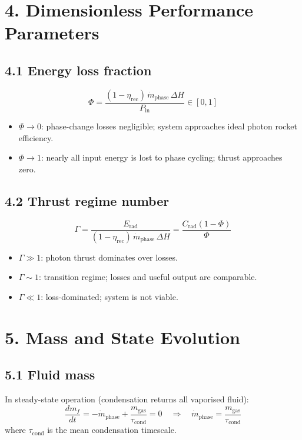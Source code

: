 \documentclass[12pt]{article}
\begin{document}
\section*{4. Dimensionless Performance Parameters}

\subsection*{4.1 Energy loss fraction}
\[
  \Phi = \frac{(1-\eta_{\mathrm{rec}})\,\dot{m}_{\mathrm{phase}}\,\Delta H}{P_{\mathrm{in}}}
  \in [0,1]
\]
\begin{itemize}
  \item $\Phi \to 0$: phase-change losses negligible; system approaches ideal
        photon rocket efficiency.
  \item $\Phi \to 1$: nearly all input energy is lost to phase cycling;
        thrust approaches zero.
\end{itemize}

\subsection*{4.2 Thrust regime number}
\[
  \Gamma = \frac{E_{\mathrm{rad}}}{(1-\eta_{\mathrm{rec}})\,\dot{m}_{\mathrm{phase}}\,\Delta H}
  = \frac{C_{\mathrm{rad}}(1-\Phi)}{\Phi}
\]
\begin{itemize}
  \item $\Gamma \gg 1$: photon thrust dominates over losses.
  \item $\Gamma \sim 1$: transition regime; losses and useful output are comparable.
  \item $\Gamma \ll 1$: loss-dominated; system is not viable.
\end{itemize}

\section*{5. Mass and State Evolution}

\subsection*{5.1 Fluid mass}
In steady-state operation (condensation returns all vaporised fluid):
\[
  \frac{dm_f}{dt} = -\dot{m}_{\mathrm{phase}} + \frac{m_{\mathrm{gas}}}{\tau_{\mathrm{cond}}} = 0
  \quad\Longrightarrow\quad
  \dot{m}_{\mathrm{phase}} = \frac{m_{\mathrm{gas}}}{\tau_{\mathrm{cond}}}
\]
where $\tau_{\mathrm{cond}}$ is the mean condensation timescale.
\end{document}
